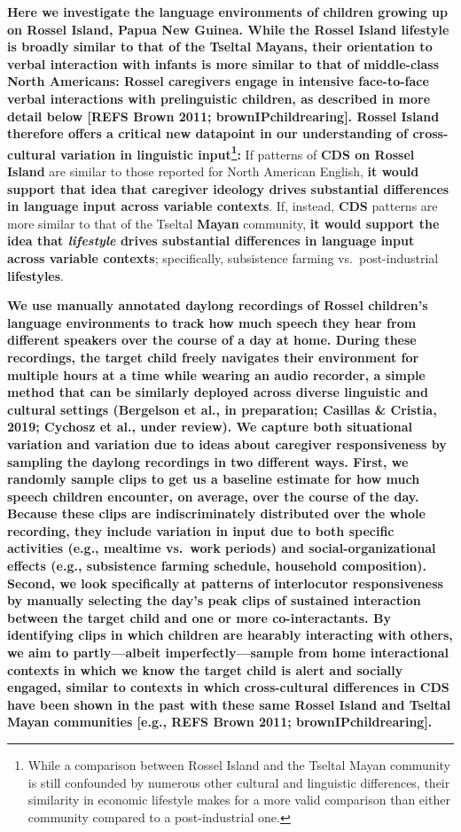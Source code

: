 \documentclass[,man,floatsintext]{apa6}
\let\rmarkdownfootnote\footnote%
\def\footnote{\protect\rmarkdownfootnote}
\begin{document}
\textbf{Here we investigate the language environments of children
growing up on Rossel Island, Papua New Guinea. While the Rossel Island
lifestyle is broadly similar to that of the Tseltal Mayans, their
orientation to verbal interaction with infants is more similar to that
of middle-class North Americans: Rossel caregivers engage in intensive
face-to-face verbal interactions with prelinguistic children, as
described in more detail below {[}REFS Brown 2011;
brownIPchildrearing{]}. Rossel Island therefore offers a critical new
datapoint in our understanding of cross-cultural variation in linguistic
input\footnote{While a comparison between Rossel Island and the Tseltal
  Mayan community is still confounded by numerous other cultural and
  linguistic differences, their similarity in economic lifestyle makes
  for a more valid comparison than either community compared to a
  post-industrial one.}:} If patterns of \textbf{CDS on Rossel Island}
are similar to those reported for North American English, \textbf{it
would support that idea that caregiver ideology drives substantial
differences in language input across variable contexts}. If, instead,
\textbf{CDS} patterns are more similar to that of the Tseltal
\textbf{Mayan} community, \textbf{it would support the idea that
\emph{lifestyle} drives substantial differences in language input across
variable contexts}; specifically, subsistence farming
vs.~post-industrial \textbf{lifestyles}.

\textbf{We use manually annotated daylong recordings of Rossel
children's language environments to track how much speech they hear from
different speakers over the course of a day at home. During these
recordings, the target child freely navigates their environment for
multiple hours at a time while wearing an audio recorder, a simple
method that can be similarly deployed across diverse linguistic and
cultural settings (Bergelson et al., in preparation; Casillas \&
Cristia, 2019; Cychosz et al., under review). We capture both
situational variation and variation due to ideas about caregiver
responsiveness by sampling the daylong recordings in two different ways.
First, we randomly sample clips to get us a baseline estimate for how
much speech children encounter, on average, over the course of the day.
Because these clips are indiscriminately distributed over the whole
recording, they include variation in input due to both specific
activities (e.g., mealtime vs.~work periods) and social-organizational
effects (e.g., subsistence farming schedule, household composition).
Second, we look specifically at patterns of interlocutor responsiveness
by manually selecting the day's peak clips of sustained interaction
between the target child and one or more co-interactants. By identifying
clips in which children are hearably interacting with others, we aim to
partly---albeit imperfectly---sample from home interactional contexts in
which we know the target child is alert and socially engaged, similar to
contexts in which cross-cultural differences in CDS have been shown in
the past with these same Rossel Island and Tseltal Mayan communities
{[}e.g., REFS Brown 2011; brownIPchildrearing{]}.}
\end{document}
